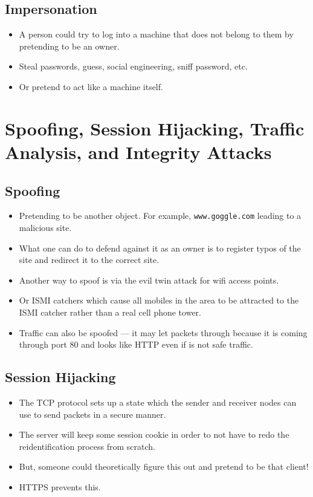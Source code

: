 \documentclass{article}
\begin{document}
\subsection{Impersonation}
\begin{itemize}
    \item A person could try to log into a machine that does not belong to them by pretending to be an owner.
    \item Steal passwords, guess, social engineering, sniff password, etc.
    \item Or pretend to act like a machine itself.
\end{itemize}


\section{Spoofing, Session Hijacking, Traffic Analysis, and Integrity Attacks}

\subsection{Spoofing}
\begin{itemize}
    \item Pretending to be another object. For example, \lstinline{www.goggle.com} leading to a malicious site.
    \item What one can do to defend against it as an owner is to register typos of the site and redirect it to the correct site.
    \item Another way to spoof is via the evil twin attack for wifi access points.
    \item Or ISMI catchers which cause all mobiles in the area to be attracted to the ISMI catcher rather than a real cell phone tower.
    \item Traffic can also be spoofed --- it may let packets through because it is coming through port 80 and looks like HTTP even if is not safe traffic.
\end{itemize}

\subsection{Session Hijacking}
\begin{itemize}
    \item The TCP protocol sets up a state which the sender and receiver nodes can use to send packets in a secure manner.
    \item The server will keep some session cookie in order to not have to redo the reidentification process from scratch.
    \item But, someone could theoretically figure this out and pretend to be that client!
    \item HTTPS prevents this.
\end{itemize}
\end{document}
